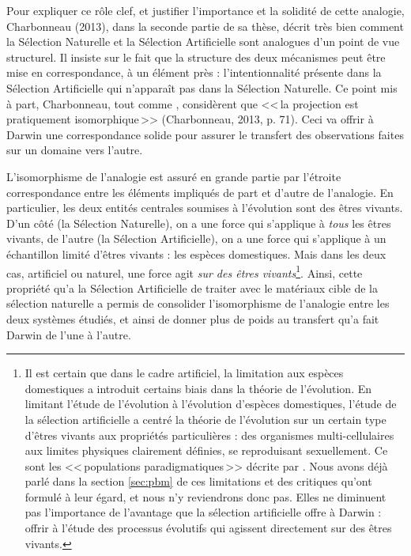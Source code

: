 Pour expliquer ce rôle clef, et justifier l'importance et la solidité de cette analogie, Charbonneau (2013), dans la seconde partie de sa thèse, décrit très bien comment la Sélection Naturelle et la Sélection Artificielle sont analogues d'un point de vue structurel. Il insiste sur le fait que la structure des deux mécanismes peut être mise en correspondance, à un élément près : l'intentionnalité présente dans la Sélection Artificielle qui n'apparaît pas dans la Sélection Naturelle. Ce point mis à part, Charbonneau, tout comme \cite{waters86takinganalogicalinferenceseriouslydarwinsargumentartificialselection}, considèrent que <<\,la projection est pratiquement isomorphique\,>> (Charbonneau, 2013, p. 71). Ceci va offrir à Darwin une correspondance solide pour assurer le transfert des observations faites sur un domaine vers l'autre. 

L'isomorphisme de l'analogie est assuré en grande partie par l'étroite correspondance entre les éléments impliqués de part et d'autre de l'analogie. En particulier, les deux entités centrales soumises à l'évolution sont des êtres vivants. D'un côté (la Sélection Naturelle), on a une force qui s'applique à \emph{tous} les êtres vivants, de l'autre (la Sélection Artificielle), on a une force qui s'applique à un échantillon limité d'êtres vivants : les espèces domestiques. Mais dans les deux cas, artificiel ou naturel, une force agit \emph{sur des êtres vivants}\footnote{Il est certain que dans le cadre artificiel, la limitation aux espèces domestiques a introduit certains biais dans la théorie de l'évolution. En limitant l'étude de l'évolution à l'évolution d'espèces domestiques, l'étude de la sélection artificielle a centré la théorie de l'évolution sur un certain type d'êtres vivants aux propriétés particulières : des organismes multi-cellulaires aux limites physiques clairement définies, se reproduisant sexuellement. Ce sont les <<\,populations paradigmatiques\,>> décrite par \cite{godfrey2009darwinian}. Nous avons déjà parlé dans la section \ref{sec:pbm} de ces limitations et des critiques qu'ont formulé \cite{godfrey2009darwinian,bouchard2011darwinismwithoutpopulationsamoreinclusiveunderstandingofsotf} à leur égard, et nous n'y reviendrons donc pas. Elles ne diminuent pas l'importance de l'avantage que la sélection artificielle offre à Darwin : offrir à l'étude des processus évolutifs qui agissent directement sur des êtres vivants.}. Ainsi, cette propriété qu'a la Sélection Artificielle de traiter avec le matériaux cible de la sélection naturelle a permis de consolider l'isomorphisme de l'analogie entre les deux systèmes étudiés, et ainsi de donner plus de poids au transfert qu'a fait Darwin de l'une à l'autre.

